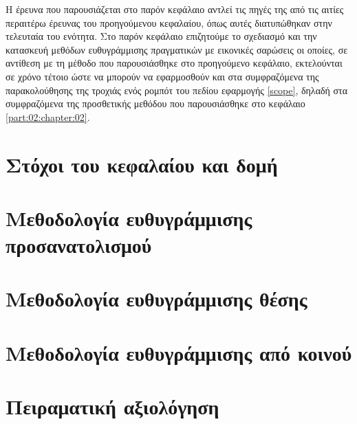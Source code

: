 Η έρευνα που παρουσιάζεται στο παρόν κεφάλαιο αντλεί τις πηγές της από τις
αιτίες περαιτέρω έρευνας του προηγούμενου κεφαλαίου, όπως αυτές διατυπώθηκαν
στην τελευταία του ενότητα. Στο παρόν κεφάλαιο επιζητούμε το σχεδιασμό και την
κατασκευή μεθόδων ευθυγράμμισης πραγματικών με εικονικές σαρώσεις οι οποίες, σε
αντίθεση με τη μέθοδο που παρουσιάσθηκε στο προηγούμενο κεφάλαιο, εκτελούνται
σε χρόνο τέτοιο ώστε να μπορούν να εφαρμοσθούν και στα συμφραζόμενα της
παρακολούθησης της τροχιάς ενός ρομπότ του πεδίου εφαρμογής \ref{scope}, δηλαδή
στα συμφραζόμενα της προσθετικής μεθόδου που παρουσιάσθηκε στο κεφάλαιο
\ref{part:02:chapter:02}.

\section{Στόχοι του κεφαλαίου και δομή}
  \label{section:02_04_01}
  

\section{Μεθοδολογία ευθυγράμμισης προσανατολισμού}
  \label{section:02_04_02}
  

\section{Μεθοδολογία ευθυγράμμισης θέσης}
  \label{section:02_04_03}
  

\section{Μεθοδολογία ευθυγράμμισης από κοινού}
  \label{section:02_04_04}
  

\section{Πειραματική αξιολόγηση}
  \label{section:02_04_05}
  

